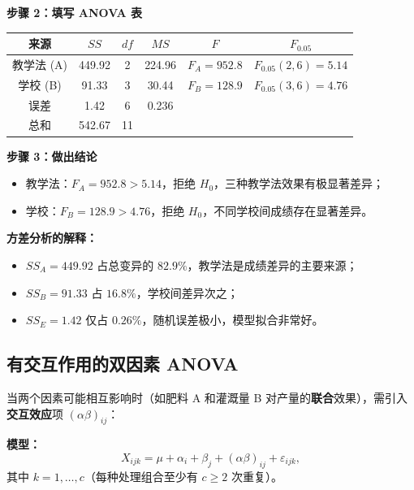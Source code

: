 \begin{example}
\textbf{步骤 2：填写 ANOVA 表}

\begin{center}
\begin{tabular}{c|c|c|c|c|c}
    \toprule
    来源 & $SS$ & $df$ & $MS$ & $F$ & $F_{0.05}$ \\
    \midrule
    教学法 (A) & 449.92 & 2   & 224.96 & $F_A = 952.8$ & $F_{0.05}(2,6)=5.14$ \\
    学校 (B)   & 91.33  & 3   & 30.44  & $F_B = 128.9$ & $F_{0.05}(3,6)=4.76$ \\
    误差       & 1.42   & 6   & 0.236  & & \\
    \midrule
    总和       & 542.67 & 11  & & & \\
    \bottomrule
\end{tabular}
\end{center}

\textbf{步骤 3：做出结论}

\begin{itemize}
    \item 教学法：$F_A = 952.8 > 5.14$，拒绝 $H_0$，三种教学法效果有极显著差异；
    \item 学校：$F_B = 128.9 > 4.76$，拒绝 $H_0$，不同学校间成绩存在显著差异。
\end{itemize}

\textbf{方差分析的解释：}
\begin{itemize}
    \item $SS_A = 449.92$ 占总变异的 $82.9\%$，教学法是成绩差异的主要来源；
    \item $SS_B = 91.33$ 占 $16.8\%$，学校间差异次之；
    \item $SS_E = 1.42$ 仅占 $0.26\%$，随机误差极小，模型拟合非常好。
\end{itemize}
\end{example}

\subsection{有交互作用的双因素 ANOVA}

当两个因素可能相互影响时（如肥料 A 和灌溉量 B 对产量的\textbf{联合}效果），需引入\textbf{交互效应}项 $(\alpha\beta)_{ij}$：

\textbf{模型：}
\begin{equation}
    X_{ijk} = \mu + \alpha_i + \beta_j + (\alpha\beta)_{ij} + \varepsilon_{ijk},
\end{equation}
其中 $k = 1,\dots,c$（每种处理组合至少有 $c \ge 2$ 次重复）。


